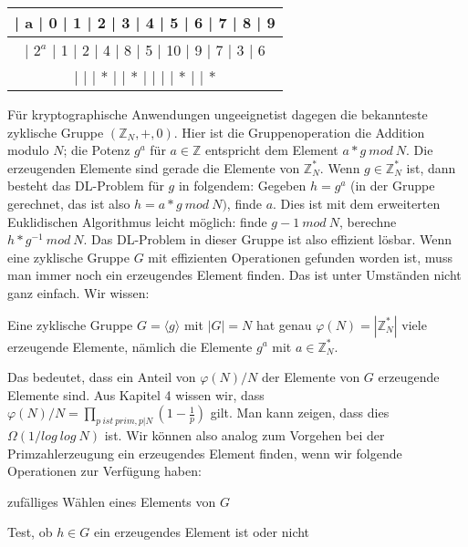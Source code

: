 \documentclass[a4paper]{article}
\begin{document}
\begin{multicols}{3}
        \begin{tabular}{c}
        | a   | 0  | 1  | 2  | 3  | 4  | 5  | 6  | 7  | 8  | 9  \\\hline
        | $2^a$ | 1  | 2  | 4  | 8  | 5  | 10 | 9  | 7  | 3  | 6  \\
        |    |   | *  |   | *  |   |   |   | *  |   | *  
        \end{tabular}

        Für kryptographische Anwendungen ungeeignetist dagegen die bekannteste zyklische Gruppe $(\mathbb{Z}_N,+,0)$. Hier ist die Gruppenoperation die Addition modulo $N$; die Potenz $g^a$ für $a\in\mathbb{Z}$ entspricht dem Element $a*g\ mod\ N$. Die erzeugenden Elemente sind gerade die Elemente von $\mathbb{Z}^*_N$. Wenn $g\in\mathbb{Z}^*_N$ ist, dann besteht das DL-Problem für $g$ in folgendem: Gegeben $h=g^a$ (in der Gruppe gerechnet, das ist also $h=a*g\ mod\ N)$, finde $a$. Dies ist mit dem erweiterten Euklidischen Algorithmus leicht möglich: finde $g-1\ mod\ N$, berechne $h*g^{-1}\ mod\ N$. Das DL-Problem in dieser Gruppe ist also effizient lösbar.
        Wenn eine zyklische Gruppe $G$ mit effizienten Operationen gefunden worden ist, muss man immer noch ein erzeugendes Element finden. Das ist unter Umständen nicht ganz einfach. Wir wissen:
        \begin{itemize*}
            \item Eine zyklische Gruppe $G=\langle g\rangle $ mit $|G|=N$ hat genau $\varphi(N) = |\mathbb{Z}^*_N|$ viele erzeugende Elemente, nämlich die Elemente $g^a$ mit $a\in\mathbb{Z}^*_N$.
        \end{itemize*}

        Das bedeutet, dass ein Anteil von $\varphi(N)/N$ der Elemente von $G$ erzeugende Elemente sind. Aus Kapitel 4 wissen wir, dass $\varphi(N)/N=\prod_{p\ ist\ prim, p|N}(1-\frac{1}{p})$ gilt. Man kann zeigen, dass dies $\Omega(1/log\ log\ N)$ ist. Wir können also analog zum Vorgehen bei der Primzahlerzeugung ein erzeugendes Element finden, wenn wir folgende Operationen zur Verfügung haben:
        \begin{itemize*}
            \item zufälliges Wählen eines Elements von $G$
            \item Test, ob $h\in G$ ein erzeugendes Element ist oder nicht
        \end{itemize*}


\end{multicols}
\end{document}
